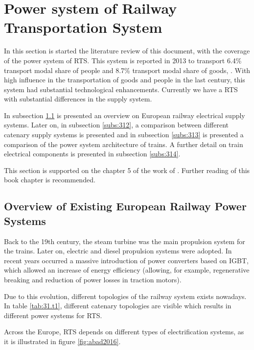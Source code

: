 




\section{Power system of Railway Transportation System}


In this section is started the literature review of this document, with the coverage of the power system of \ac{RTS}. This system is reported in 2013 to transport 6.4\% transport modal share of people and 8.7\% transport modal share of goods, \cite{iea-uic2016}. With high influence in the transportation of goods and people in the last century, this system had substantial technological enhancements. Currently we have a \ac{RTS} with substantial differences in the supply system.

In subsection \ref{subs:311} is presented an overview on European railway electrical supply systems. Later on, in subsection \ref{subs:312}, a comparison between different catenary supply systems is presented and in subsection \ref{subs:313} is presented a comparison of the power system architecture of trains. A further detail on train electrical components is presented in subsection \ref{subs:314}.

This section is supported on the chapter 5 of the work of \cite{abad2016}. Further reading of this book chapter is recommended. 

\subsection{Overview of Existing European Railway Power Systems}
\label{subs:311}
Back to the 19th century, the steam turbine was the main propulsion system for the trains. Later on, electric and diesel propulsion systems were adopted. In recent years occurred a massive introduction of power converters based on \ac{IGBT}, which allowed an increase of energy efficiency (allowing, for example, regenerative breaking and reduction of power losses in traction motors).

Due to this evolution, different topologies of the railway system exists nowadays. In table \ref{tab:31.t1}, different catenary topologies are visible which results in different power systems for \ac{RTS}.




Across the Europe, \ac{RTS} depends on different types of electrification systems, as it is illustrated in figure \ref{fig:abad2016}.



